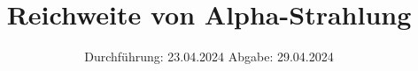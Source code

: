 

\subject{v701}
\title{Reichweite von Alpha-Strahlung}
\date{%
  Durchführung: 23.04.2024
  \hspace{3em}
  Abgabe: 29.04.2024
}



\maketitle
\thispagestyle{empty}
\tableofcontents
\newpage






\printbibliography{}


